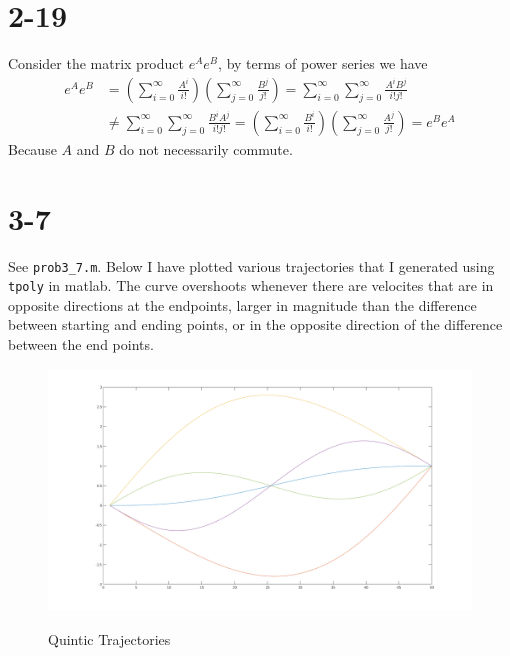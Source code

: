 \documentclass{../homework}
\begin{document}
\begin{parts}[n]
\begin{parts}
        \part{2-19}
        Consider the matrix product $e^Ae^B$, by terms of power series we have
        \[
            \begin{aligned}
                e^Ae^B &= \left( \sum_{i=0}^{\infty} \frac{A^i}{i!} \right) \left( \sum_{j=0}^{\infty} \frac{B^j}{j!} \right) = \sum_{i=0}^{\infty}\sum_{j=0}^{\infty} \frac{A^iB^j}{i!j!} \\
                       &\neq \sum_{i=0}^{\infty}\sum_{j=0}^{\infty} \frac{B^iA^j}{i!j!} = \left( \sum_{i=0}^{\infty} \frac{B^i}{i!} \right) \left( \sum_{j=0}^{\infty}\frac{A^j}{j!} \right) = e^Be^A
            \end{aligned}
        \]
        Because $A$ and $B$ do not necessarily commute.
        \part{3-7} See \texttt{prob3\_7.m}. Below I have plotted various trajectories that I generated using \texttt{tpoly} in matlab. The curve overshoots whenever there are velocites that are in opposite directions at the endpoints, larger in magnitude than the difference between starting and ending points, or in the opposite direction of the difference between the end points.
        \begin{figure}[H]
            \centering
            \includegraphics[scale=.3]{3_7.png}
            \label{Traj}
            \caption{Quintic Trajectories}
       \end{figure}

\end{parts}
\end{parts}
\end{document}
